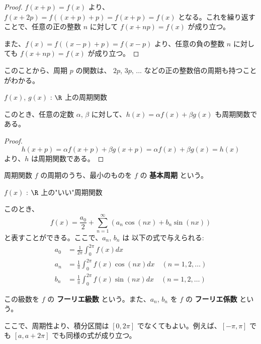 \documentclass[article,paper=a4paper]{jlreq}
\begin{document}
\begin{proof}
    $f(x+p) = f(x)$ より、$f(x+2p) = f((x+p)+p) = f(x+p) = f(x)$ となる。これを繰り返すことで、任意の正の整数 $n$ に対して $f(x+np) = f(x)$ が成り立つ。

    また、$f(x) = f((x-p)+p) = f(x-p)$ より、任意の負の整数 $n$ に対しても $f(x+np) = f(x)$ が成り立つ。
\end{proof}

このことから、周期 $p$ の関数は、 $2p$, $3p$, ... などの正の整数倍の周期も持つことがわかる。

\begin{prop}
    \quad $f(x)$, $g(x)$ : $\R$ 上の周期関数\par
    このとき、任意の定数 $\alpha$, $\beta$ に対して、$h(x) = \alpha f(x) + \beta g(x)$ も周期関数である。
\end{prop}

\begin{proof}
    \[h(x+p) = \alpha f(x+p) + \beta g(x+p) = \alpha f(x) + \beta g(x) = h(x)\]
    より、$h$ は周期関数である。
\end{proof}

\begin{dfn}
    周期関数 $f$ の周期のうち、最小のものを $f$ の \textbf{基本周期} という。
\end{dfn}

\begin{thm}
    \quad $f(x)$ : $\R$ 上の"いい"周期関数\par
    このとき、
    \[f(x) = \frac{a_0}{2} + \sum_{n=1}^{\infty} (a_n \cos(nx) + b_n \sin(nx))\]
    と表すことができる。ここで、$a_n$, $b_n$ は 以下の式で与えられる:
\begin{align*}
    a_0 &= \frac{1}{2\pi} \int_{0}^{2\pi} f(x) dx \\
    a_n &= \frac{1}{\pi} \int_{0}^{2\pi} f(x) \cos (nx) dx \quad (n = 1, 2, \ldots) \\
    b_n &= \frac{1}{\pi} \int_{0}^{2\pi} f(x) \sin (nx) dx  \quad (n = 1, 2, \ldots)
\end{align*}
    
    この級数を $f$ の \textbf{フーリエ級数} という。また、$a_n$, $b_n$ を $f$ の \textbf{フーリエ係数} という。

    ここで、周期性より、積分区間は $[0, 2\pi]$ でなくてもよい。例えば、$[-\pi, \pi]$ でも $[a,a+2\pi]$ でも同様の式が成り立つ。
\end{thm}
\end{document}
